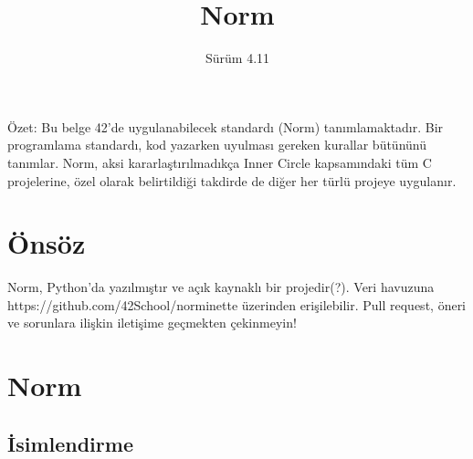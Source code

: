 \documentclass{42-en}
\begin{document}
\title{Norm}
\subtitle{Sürüm 4.11}

\summary
{
    Özet: Bu belge 42’de uygulanabilecek standardı (Norm) tanımlamaktadır.
    Bir programlama standardı, kod yazarken uyulması gereken kurallar bütününü
    tanımlar. Norm, aksi kararlaştırılmadıkça Inner Circle kapsamındaki
    tüm C projelerine, özel olarak belirtildiği takdirde de diğer her türlü
    projeye uygulanır.
}

\maketitle

\tableofcontents



\chapter{Önsöz}

    Norm, Python’da yazılmıştır ve açık kaynaklı bir projedir(?).
    Veri havuzuna https://github.com/42School/norminette üzerinden erişilebilir.
    Pull request, öneri ve sorunlara ilişkin iletişime geçmekten çekinmeyin!

\chapter{Norm}


    \section{İsimlendirme}
\end{document}
